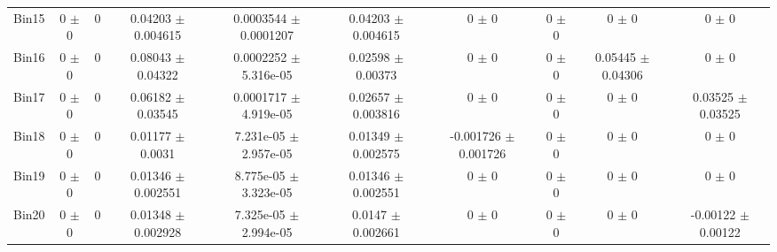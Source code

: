 \begin{tabular}{@{\extracolsep{4pt}}lccccccccc@{}}
     Bin15 & 0 $\pm$ 0 & 0 & 0.04203 $\pm$ 0.004615 & 0.0003544 $\pm$ 0.0001207 & 0.04203 $\pm$ 0.004615 & 0 $\pm$ 0 & 0 $\pm$ 0 & 0 $\pm$ 0 & 0 $\pm$ 0 \\ 
     Bin16 & 0 $\pm$ 0 & 0 & 0.08043 $\pm$ 0.04322 & 0.0002252 $\pm$ 5.316e-05 & 0.02598 $\pm$ 0.00373 & 0 $\pm$ 0 & 0 $\pm$ 0 & 0.05445 $\pm$ 0.04306 & 0 $\pm$ 0 \\ 
     Bin17 & 0 $\pm$ 0 & 0 & 0.06182 $\pm$ 0.03545 & 0.0001717 $\pm$ 4.919e-05 & 0.02657 $\pm$ 0.003816 & 0 $\pm$ 0 & 0 $\pm$ 0 & 0 $\pm$ 0 & 0.03525 $\pm$ 0.03525 \\ 
     Bin18 & 0 $\pm$ 0 & 0 & 0.01177 $\pm$ 0.0031 & 7.231e-05 $\pm$ 2.957e-05 & 0.01349 $\pm$ 0.002575 & -0.001726 $\pm$ 0.001726 & 0 $\pm$ 0 & 0 $\pm$ 0 & 0 $\pm$ 0 \\ 
     Bin19 & 0 $\pm$ 0 & 0 & 0.01346 $\pm$ 0.002551 & 8.775e-05 $\pm$ 3.323e-05 & 0.01346 $\pm$ 0.002551 & 0 $\pm$ 0 & 0 $\pm$ 0 & 0 $\pm$ 0 & 0 $\pm$ 0 \\ 
     Bin20 & 0 $\pm$ 0 & 0 & 0.01348 $\pm$ 0.002928 & 7.325e-05 $\pm$ 2.994e-05 & 0.0147 $\pm$ 0.002661 & 0 $\pm$ 0 & 0 $\pm$ 0 & 0 $\pm$ 0 & -0.00122 $\pm$ 0.00122 \\ 
\hline\hline
  \end{tabular}

